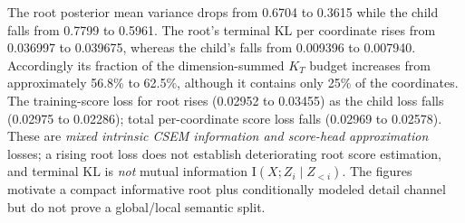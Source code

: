 \documentclass[10pt]{article}
\newcommand{\II}{\mathrm I}
\begin{document}
The root posterior mean variance drops from 0.6704 to 0.3615 while the child falls from 0.7799 to 0.5961. The root's terminal KL per coordinate rises from 0.036997 to 0.039675, whereas the child's falls from 0.009396 to 0.007940. Accordingly its fraction of the dimension-summed $K_T$ budget increases from approximately 56.8\% to 62.5\%, although it contains only 25\% of the coordinates. The training-score loss for root rises (0.02952 to 0.03455) as the child loss falls (0.02975 to 0.02286); total per-coordinate score loss falls (0.02969 to 0.02578). These are \emph{mixed intrinsic CSEM information and score-head approximation} losses; a rising root loss does not establish deteriorating root score estimation, and terminal KL is \emph{not} mutual information $\II(X;Z_i\mid Z_{<i})$. The figures motivate a compact informative root plus conditionally modeled detail channel but do not prove a global/local semantic split.
\begin{center}
\end{center}
\end{document}

